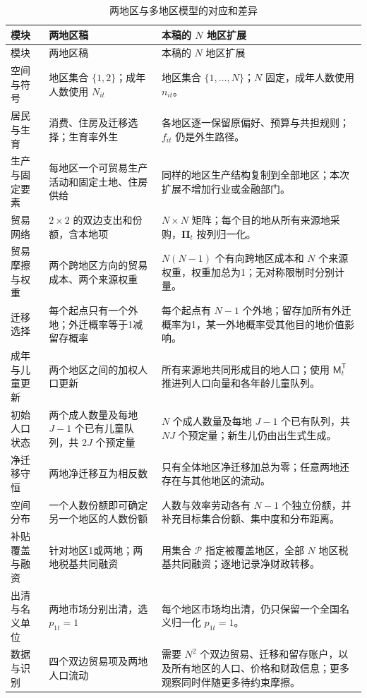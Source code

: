 \documentclass[UTF8,a4paper,zihao=-4,fontset=windows]{ctexart}
\numberwithin{equation}{section}
\begin{document}
\begin{longtable}{L{0.18\textwidth}L{0.34\textwidth}L{0.38\textwidth}}
\caption{两地区与多地区模型的对应和差异}\label{tab:two-versus-many}\\
\toprule
模块 & 两地区稿 & 本稿的 $N$ 地区扩展\\
\midrule
\endfirsthead
\toprule
模块 & 两地区稿 & 本稿的 $N$ 地区扩展\\
\midrule
\endhead
\bottomrule
\endfoot
空间与符号 & 地区集合 $\{1,2\}$；成年人数使用 $N_{it}$ & 地区集合 $\{1,\ldots,N\}$；$N$ 固定，成年人数使用 $n_{it}$。\\
居民与生育 & 消费、住房及迁移选择；生育率外生 & 各地区逐一保留原偏好、预算与共担规则；$f_{it}$ 仍是外生路径。\\
生产与固定要素 & 每地区一个可贸易生产活动和固定土地、住房供给 & 同样的地区生产结构复制到全部地区；本次扩展不增加行业或金融部门。\\
贸易网络 & $2\times2$ 的双边支出和份额，含本地项 & $N\times N$ 矩阵；每个目的地从所有来源地采购，$\bm\Pi_t$ 按列归一化。\\
贸易摩擦与权重 & 两个跨地区方向的贸易成本、两个来源权重 & $N(N-1)$ 个有向跨地区成本和 $N$ 个来源权重，权重加总为1；无对称限制时分别计量。\\
迁移选择 & 每个起点只有一个外地；外迁概率等于1减留存概率 & 每个起点有 $N-1$ 个外地；留存加所有外迁概率为1，某一外地概率受其他目的地价值影响。\\
成年与儿童更新 & 两个地区之间的加权人口更新 & 所有来源地共同形成目的地人口；使用 $\mathsf M_t^{\mathsf T}$ 推进列人口向量和各年龄儿童队列。\\
初始人口状态 & 两个成人数量及每地 $J-1$ 个已有儿童队列，共 $2J$ 个预定量 & $N$ 个成人数量及每地 $J-1$ 个已有队列，共 $NJ$ 个预定量；新生儿仍由出生式生成。\\
净迁移守恒 & 两地净迁移互为相反数 & 只有全体地区净迁移加总为零；任意两地还存在与其他地区的流动。\\
空间分布 & 一个人数份额即可确定另一个地区的人数份额 & 人数与效率劳动各有 $N-1$ 个独立份额，并补充目标集合份额、集中度和分布距离。\\
补贴覆盖与融资 & 针对地区1或两地；两地税基共同融资 & 用集合 $\mathcal P$ 指定被覆盖地区，全部 $N$ 地区税基共同融资；逐地记录净财政转移。\\
出清与名义单位 & 两地市场分别出清，选 $p_{1t}=1$ & 每个地区市场均出清，仍只保留一个全国名义归一化 $p_{1t}=1$。\\
数据与识别 & 四个双边贸易项及两地人口流动 & 需要 $N^2$ 个双边贸易、迁移和留存账户，以及所有地区的人口、价格和财政信息；更多观察同时伴随更多待约束摩擦。\\
\end{longtable}
\normalsize
\end{document}
